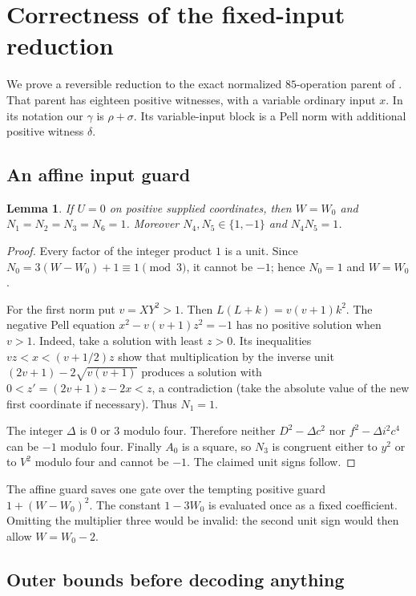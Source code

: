 \documentclass[11pt]{article}
\newtheorem{lemma}[theorem]{Lemma}
\theoremstyle{remark}\newtheorem{remark}[theorem]{Remark}
\begin{document}
\section{Correctness of the fixed-input reduction}\label{sec:proof}

We prove a reversible reduction to the exact normalized
$85$-operation parent of \cite{Bezout85}. That parent has eighteen
positive witnesses, with a variable ordinary input $x$. In its
notation our $\gamma$ is $\rho+\sigma$. Its variable-input block is
a Pell norm with additional positive witness $\delta$.

\subsection{An affine input guard}

\begin{lemma}\label{lem:unit}
If $U=0$ on positive supplied coordinates, then $W=W_0$ and
$N_1=N_2=N_3=N_6=1$. Moreover $N_4,N_5\in\{1,-1\}$ and
$N_4N_5=1$.
\end{lemma}
\begin{proof}
Every factor of the integer product $1$ is a unit. Since
$N_0=3(W-W_0)+1\equiv1\pmod3$, it cannot be $-1$; hence
$N_0=1$ and $W=W_0$.

For the first norm put $v=XY^2>1$. Then
$L(L+k)=v(v+1)k^2$. The negative Pell equation
$x^2-v(v+1)z^2=-1$ has no positive solution when $v>1$.
Indeed, take a solution with least $z>0$. Its inequalities
$vz<x<(v+1/2)z$ show that multiplication by the inverse unit
$(2v+1)-2\sqrt{v(v+1)}$ produces a solution with
$0<z'=(2v+1)z-2x<z$, a contradiction (take the absolute value
of the new first coordinate if necessary). Thus $N_1=1$.

The integer $\Delta$ is $0$ or $3$ modulo four. Therefore neither
$D^2-\Delta c^2$ nor $f^2-\Delta i^2c^4$ can be $-1$ modulo
four. Finally $A_0$ is a square, so $N_3$ is congruent either
to $y^2$ or to $V^2$ modulo four and cannot be $-1$. The claimed
unit signs follow.
\end{proof}

The affine guard saves one gate over the tempting positive guard
$1+(W-W_0)^2$. The constant $1-3W_0$ is evaluated once as a
fixed coefficient. Omitting the multiplier three would be invalid:
the second unit sign would then allow $W=W_0-2$.

\subsection{Outer bounds before decoding anything}
\end{document}
